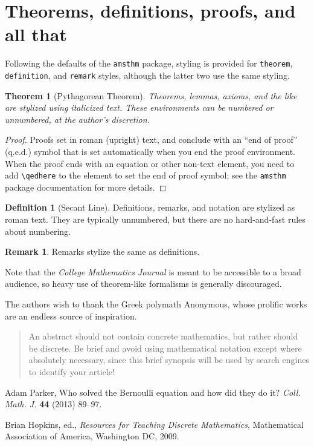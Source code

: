 \documentclass{article}
\theoremstyle{theorem}
\newtheorem{theorem}{Theorem}
\theoremstyle{definition}
\newtheorem*{definition}{Definition}
\newtheorem*{remark}{Remark}
\begin{document}
\section{Theorems, definitions, proofs, and all that}

Following the defaults of the \texttt{amsthm} package, styling is provided for \texttt{theorem}, \texttt{definition}, and \texttt{remark} styles, although the latter two use the same styling.

\begin{theorem}[Pythagorean Theorem]
Theorems, lemmas, axioms, and the like are stylized using italicized text. These environments can be numbered or unnumbered, at the author's discretion.
\end{theorem}

\begin{proof}
Proofs set in roman (upright) text, and conclude with an ``end of proof'' (q.e.d.) symbol that is set automatically when you end the proof environment.  When the proof ends with an equation or other non-text element, you need to add \verb~\qedhere~ to the element to set the end of proof symbol; see the \texttt{amsthm} package documentation for more details.
\end{proof}

\begin{definition}[Secant Line]
Definitions, remarks, and notation are stylized as roman text.  They are typically unnumbered, but there are no hard-and-fast rules about numbering.
\end{definition}

\begin{remark}
Remarks stylize the same as definitions.
\end{remark}

Note that the \textit{College Mathematics Journal\/} is meant to be accessible to a broad audience, so heavy use of theorem-like formalisms is generally discouraged.

\begin{acknowledgment}
The authors wish to thank the Greek polymath Anonymous, whose prolific works are an endless source of inspiration.
\end{acknowledgment}

\begin{abstract}
An abstract should not contain concrete mathematics, but rather should be discrete.  Be brief and avoid using mathematical notation except where absolutely necessary, since this brief synopsis will be used by search engines to identify your article!
\end{abstract}

\begin{thebibliography}{1}
 Adam Parker, Who solved the Bernoulli equation and how did they do it? \textit{Coll. Math. J.} \textbf{44} (2013) 89--97.

 Brian Hopkins, ed., \textit{Resources for Teaching Discrete Mathematics}, Mathematical Association of America, Washington DC, 2009.
\end{thebibliography}
\vfill\eject
\end{document}
